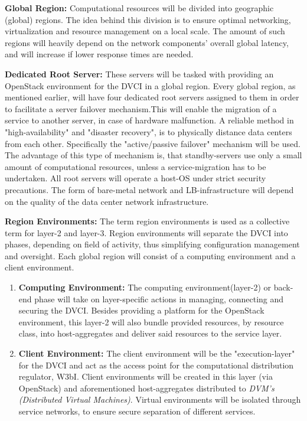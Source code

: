 \documentclass[]{article}
\begin{document}
\textbf{Global Region:} 
Computational resources will be divided into geographic (global) regions.
The idea behind this division is to ensure optimal networking, virtualization and resource management on a local scale.
The amount of such regions will heavily depend on the network components' overall global latency, and will increase if lower response times are needed.
\newline

\textbf{Dedicated Root Server:}
These servers will be tasked with providing an OpenStack environment for the DVCI in a global region.
Every global region, as mentioned earlier, will have four dedicated root servers assigned to them in order to facilitate a server failover mechanism.This will enable the migration of a service to another server, in case of hardware malfunction.
A reliable method in "high-availability" and "disaster recovery", is to physically distance data centers from each other. 
Specifically the "active/passive failover" mechanism will be used.
The advantage of this type of mechanism is, that standby-servers use only a small amount of computational resources, unless a service-migration has to be undertaken. 
All root servers will operate a host-OS under strict security precautions. 
The form of bare-metal network and LB-infrastructure will depend on the quality of the data center network infrastructure.
\newline

\textbf{Region Environments:}
The term region environments is used as a collective term for layer-2 and layer-3. 
Region environments will separate the DVCI into phases, depending on field of activity, thus simplifying configuration management and oversight.
Each global region will consist of a computing environment and a client environment. 

\begin{enumerate}[label=\textbullet]
	\item\textbf{Computing Environment:}
	The computing environment(layer-2) or back-end phase will take on layer-specific actions in managing, connecting and securing the DVCI. 
	Besides providing a platform for the OpenStack environment, this layer-2 will also bundle provided resources, by resource class, into host-aggregates and deliver said resources to the service layer.  
	
	\item\textbf{Client Environment:} 
	The client environment will be the "execution-layer" for the DVCI and act as the access point for the computational distribution regulator, W3bI. 
	Client environments will be created in this layer (via OpenStack) and aforementioned host-aggregates distributed to \textit{DVM's (Distributed Virtual Machines)}.
	Virtual environments will be isolated through service networks, to ensure secure separation of different services. 
\end{enumerate}
\end{document}
